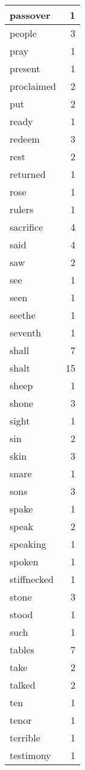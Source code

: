 \begin{center}
\begin{longtable}{l|r}
passover & 1 \\ \hline
people & 3 \\ \hline
pray & 1 \\ \hline
present & 1 \\ \hline
proclaimed & 2 \\ \hline
put & 2 \\ \hline
ready & 1 \\ \hline
redeem & 3 \\ \hline
rest & 2 \\ \hline
returned & 1 \\ \hline
rose & 1 \\ \hline
rulers & 1 \\ \hline
sacrifice & 4 \\ \hline
said & 4 \\ \hline
saw & 2 \\ \hline
see & 1 \\ \hline
seen & 1 \\ \hline
seethe & 1 \\ \hline
seventh & 1 \\ \hline
shall & 7 \\ \hline
shalt & 15 \\ \hline
sheep & 1 \\ \hline
shone & 3 \\ \hline
sight & 1 \\ \hline
sin & 2 \\ \hline
skin & 3 \\ \hline
snare & 1 \\ \hline
sons & 3 \\ \hline
spake & 1 \\ \hline
speak & 2 \\ \hline
speaking & 1 \\ \hline
spoken & 1 \\ \hline
stiffnecked & 1 \\ \hline
stone & 3 \\ \hline
stood & 1 \\ \hline
such & 1 \\ \hline
tables & 7 \\ \hline
take & 2 \\ \hline
talked & 2 \\ \hline
ten & 1 \\ \hline
tenor & 1 \\ \hline
terrible & 1 \\ \hline
testimony & 1 \\ \hline

\end{longtable}
\end{center}
